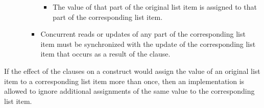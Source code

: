 \begin{enumerate}
\begin{enumerate}
\begin{itemize}
\begin{itemize}
        \item The value of that part of the
        original list item is assigned to that part of the corresponding list item.

   \end{itemize}

    \item Concurrent reads or updates of any part
        of the corresponding list item must be synchronized with the update of the
        corresponding list item that occurs as a result of the  clause.

\end{itemize}
\end{enumerate}

\end{enumerate}

\begin{note}
If the effect of the  clauses on a construct would assign the
value of an original list item to a corresponding list item more than once,
then an implementation is allowed to ignore additional assignments of
the same value to the corresponding list item.
\end{note}


